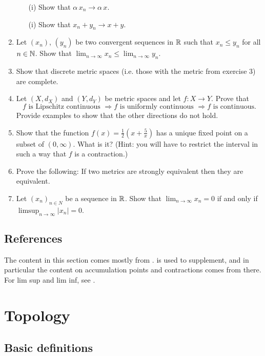 \documentclass{article}
\begin{document}
\begin{enumerate}
    \begin{enumerate}
        \item[(i)] Show that $\alpha \, x_n \to \alpha \, x$.
        \item[(i)] Show that $x_n + y_n \to x + y$.
    \end{enumerate}
    \item Let $(x_n)$, $(y_n)$ be two convergent sequences in ${\mathbb{R}}$ such that $x_n \leq y_n$ for all $n \in {\mathbb{N}}$. Show that $\lim_{n\to \infty} x_n \leq \lim_{n\to \infty} y_n$.
    \item Show that discrete metric spaces (i.e. those with the metric from exercise 3) are complete. 
    \item Let $(X,d_X)$ and $(Y,d_Y)$ be metric spaces and let $f:X\to Y$. Prove that
$$f \text{ is Lipschitz continuous } \Rightarrow f \text{ is uniformly continuous } \Rightarrow f \text{ is continuous}.$$
Provide examples to show that the other directions do not hold.
    \item Show that the function $f(x) = \frac{1}{2} \left(x + \frac{5}{x} \right)$ has a unique fixed point on a subset of $(0,\infty)$. What is it? (Hint: you will have to restrict the interval in such a way that $f$ is a contraction.)
    \item Prove the following: If two metrics are strongly equivalent then they are equivalent.
    \item Let $(x_n)_{n\in N}$ be a sequence in ${\mathbb{R}}$. Show that $\lim_{n\to \infty} x_n = 0$ if and only if $\limsup_{n\to \infty} \vert x_n\vert = 0$.
\end{enumerate}

\subsection{References}
The content in this section comes mostly from \cite{tastetopology}. \cite{realanalysis} is used to supplement, and in particular the content on accumulation points and contractions comes from there. For lim sup and lim inf, see \cite{BasicAnalysis1}.


\section{Topology}

\subsection{Basic definitions}
\end{document}
